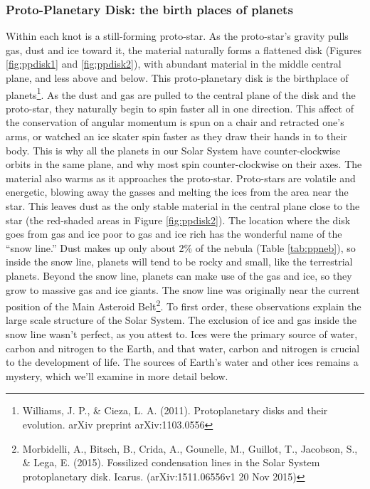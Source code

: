 \documentclass[amstex,12pt]{book}
\begin{document}
\subsubsection{Proto-Planetary Disk: the birth places of planets}
Within each knot is a still-forming proto-star. As the proto-star's gravity pulls gas, dust and ice toward it, the material naturally forms a flattened disk (Figures \ref{fig:ppdisk1} and \ref{fig:ppdisk2}), with abundant material in the middle central plane, and less above and below. This proto-planetary disk is the birthplace of planets\footnote{Williams, J. P., \& Cieza, L. A. (2011). Protoplanetary disks and their evolution. arXiv preprint arXiv:1103.0556}. As the dust and gas are pulled to the central plane of the disk and the proto-star, they naturally begin to spin faster all in one direction. This affect of the conservation of angular momentum is spun on a chair and retracted one's arms, or watched an ice skater spin faster as they draw their hands in to their body. This is why all the planets in our Solar System have counter-clockwise orbits in the same plane, and why most spin counter-clockwise on their axes. The material also warms as it approaches the proto-star. Proto-stars are volatile and energetic, blowing away the gasses and melting the ices from the area near the star. This leaves dust as the only stable material in the central plane close to the star (the red-shaded areas in Figure \ref{fig:ppdisk2}). The location where the disk goes from gas and ice poor to gas and ice rich has the wonderful name of the ``snow line.'' Dust makes up only about 2\% of the nebula (Table \ref{tab:ppneb}), so inside the snow line, planets will tend to be rocky and small, like the terrestrial planets. Beyond the snow line, planets can make use of the gas and ice, so they grow to massive gas and ice giants. The snow line was originally near the current position of the Main Asteroid Belt\footnote{Morbidelli, A., Bitsch, B., Crida, A., Gounelle, M., Guillot, T., Jacobson, S., \& Lega, E. (2015). Fossilized condensation lines in the Solar System protoplanetary disk. Icarus. (arXiv:1511.06556v1 20 Nov 2015)}. To first order, these observations explain the large scale structure of the Solar System. The exclusion of ice and gas inside the snow line wasn't perfect, as you attest to. Ices were the primary source of water, carbon and nitrogen to the Earth, and that water, carbon and nitrogen is crucial to the development of life. The sources of Earth's water and other ices remains a mystery, which we'll examine in more detail below.\\
\end{document}
